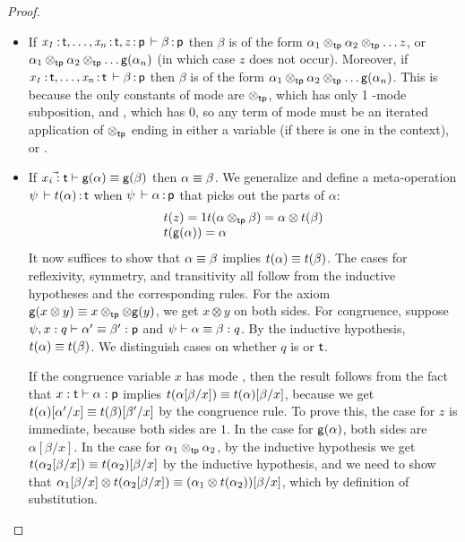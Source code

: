 \begin{proof}
\begin{itemize}
\item If $\mathit{x_1} \, \mathit{:} \, \mathit{\mathsf{t}}, \ldots, \mathit{x_n} \, \mathit{:} \, \mathit{\mathsf{t}},
  \mathit{z} \, \mathit{:} \, \mathit{\mathsf{p}} \, \vdash \beta \, \mathit{:} \, \mathsf{p}$ then $\beta$ is of the form
  $\alpha_1 \otimes_{\mathsf{tp}} \alpha_2 \otimes_{\mathsf{tp}} \ldots z$, or
  $\alpha_1 \otimes_{\mathsf{tp}} \alpha_2 \otimes_{\mathsf{tp}} \ldots \mathsf{g}(\alpha_{n})$ (in which
  case $z$ does not occur).  Moreover, if $\mathit{x_1} \, \mathit{:} \, \mathit{\mathsf{t}},
    \ldots, \mathit{x_n} \, \mathit{:} \, \mathit{\mathsf{t}} \, \vdash \beta \, \mathit{:} \, \mathsf{p}$ then $\beta$ is of the
  form $\alpha_1 \otimes_{\mathsf{tp}} \alpha_2 \otimes_{\mathsf{tp}} \ldots \mathsf{g}(\alpha_{n})$.
  This is because the only constants of mode  are $\otimes_{\mathsf{tp}}$,
  which has only 1 -mode subposition, and , which has 0,
  so any term of mode  must be an iterated application of
  $\otimes_{\mathsf{tp}}$ ending in either a variable (if there is one in the
  context), or .

\item If $\vec{x_i : \mathsf{t}} \vdash \mathsf{g}(\alpha) \equiv
  \mathsf{g}(\beta)$ then $\alpha \equiv \beta$.  We generalize and define a
  meta-operation $\psi \, \vdash t(\alpha) \, \mathit{:} \, \mathsf{t}$ when
  $\psi \, \vdash \alpha \, \mathit{:} \, \mathsf{p}$ that picks out the  parts of
  $\alpha$: 
  \[
  \begin{array}{l}
    t(z) = 1
    t(\alpha \otimes_{\mathsf{tp}} \beta) = \alpha \otimes t(\beta)\\
    t(\mathsf{g}(\alpha)) = \alpha
  \end{array}
  \]
  It now suffices to show that $\alpha \equiv \beta$ implies $t(\alpha)
  \equiv t(\beta)$.  The cases for reflexivity, symmetry, and transitivity
  all follow from the inductive hypotheses and the corresponding rules.
  For the axiom $\mathsf{g}(x \otimes y) \equiv x \otimes_{\mathsf{tp}} \otimes \mathsf{g}(y)$,
  we get $x \otimes y$ on both sides.  For congruence, suppose $\psi,x:q
  \vdash \alpha' \equiv \beta' : \mathsf{p}$ and $\psi \vdash \alpha \equiv
  \beta : q$.  By the inductive hypothesis, $t(\alpha) \equiv t(\beta)$.
  We distinguish cases on whether $q$ is  or $\mathsf{t}$.  

  If the congruence variable $x$ has mode , then the result
  follows from the fact that $x : \mathsf{t} \vdash \alpha : \mathsf{p}$ implies
  $t(\alpha[\beta/x]) \equiv t(\alpha)[\beta/x]$, because we get
  $t(\alpha)[\alpha'/x] \equiv t(\beta)[\beta'/x]$ by the congruence rule.
  To prove this, the case for $z$ is immediate, because both sides are
  $1$.  In the case for $\mathsf{g}(\alpha)$, both sides are
  $\alpha[\beta/x]$.  In the case for $\alpha_1 \otimes_{\mathsf{tp}} \alpha_2$, by the
  inductive hypothesis we get $t(\alpha_2[\beta/x]) \equiv
  t(\alpha_2)[\beta/x]$ by the inductive hypothesis, and we need to show
  that $\alpha_1[\beta/x] \otimes t(\alpha_2[\beta/x]) \equiv (\alpha_1
  \otimes t(\alpha_2))[\beta/x]$, which by definition of substitution.
  

\end{itemize}
\end{proof}
